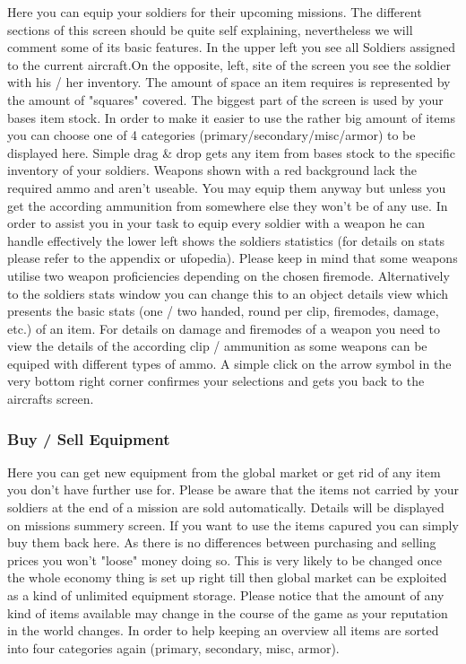 Here you can equip your soldiers for their upcoming missions. The different sections of this screen should be quite self explaining, nevertheless we will comment some of its basic features. In the upper left you see all Soldiers assigned to the current aircraft.On the opposite, left, site of the screen you see the soldier with his / her inventory. The amount of space an item requires is represented by the amount of "squares" covered. The biggest part of the screen is used by your bases item stock. In order to make it easier to use the rather big amount of items you can choose one of 4 categories (primary/secondary/misc/armor) to be displayed here.  Simple drag & drop gets any item from bases stock to the specific inventory of your soldiers. Weapons shown with a red background lack the required ammo and aren't useable. You may equip them anyway but unless you get the according ammunition from somewhere else they won't be of any use. In order to assist you in your task to equip every soldier with a weapon he can handle effectively the lower left shows the soldiers statistics (for details on stats please refer to the appendix or ufopedia). Please keep in mind that some weapons utilise two weapon proficiencies depending on the chosen firemode. Alternatively to the soldiers stats window you can change this to an object details view which presents the basic stats (one / two handed, round per clip, firemodes, damage, etc.) of an item. For details on damage and firemodes of a weapon you need to view the details of the according clip / ammunition as some weapons can be equiped with different types of ammo. A simple click on the arrow symbol in the very bottom right corner confirmes your selections and gets you back to the aircrafts screen.

\subsubsection{Buy / Sell Equipment}
Here you can get new equipment from the global market or get rid of any item you don't have further use for. Please be aware that the items not carried by your soldiers at the end of a mission are sold automatically. Details will be displayed on missions summery screen. If you want to use the items capured you can simply buy them back here. As there is no differences between purchasing and selling prices you won't "loose" money doing so. This is very likely to be changed once the whole economy thing is set up right till then global market can be exploited as a kind of unlimited equipment storage. Please notice that the amount of any kind of items available may change in the course of the game as your reputation in the world changes. In order to help keeping an overview all items are sorted into four categories again (primary, secondary, misc, armor).

